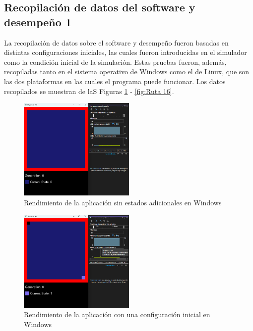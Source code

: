 \subsection{Recopilaci\'on de datos del software y desempe\~no 1}
    La recopilaci\'on de datos sobre el software y desempe\~no
        fueron basadas en distintas configuraciones iniciales, las
        cuales fueron introducidas en el simulador como la
        condici\'on inicial de la simulaci\'on. Estas pruebas fueron,
        adem\'as, recopiladas tanto en el sistema operativo de
        Windows como el de Linux, que son las dos plataformas en
        las cuales el programa puede funcionar. Los datos
        recopilados se muestran de laS Figuras \ref{fig:Ruta 6} - \ref{fig:Ruta 16}.
    \vskip 0.5cm
    \begin{figure}[htbp]
        \centering
        \includegraphics[width=0.5\textwidth]{./images/Pruebas/simulador/image019.png}
        \caption{Rendimiento de la aplicaci\'on sin estados adicionales en Windows}
        \label{fig:Ruta 6}
    \end{figure}
    \vskip 0.5cm
    \begin{figure}[htbp]
        \centering
        \includegraphics[width=0.5\textwidth]{./images/Pruebas/simulador/image021.png}
        \caption{Rendimiento de la aplicaci\'on con una configuraci\'on inicial en Windows}
        \label{fig:Ruta 7}
    \end{figure}
